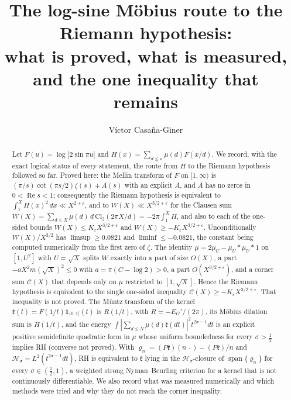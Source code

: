 \documentclass[11pt,reqno]{amsart}
\numberwithin{equation}{section}
\theoremstyle{plain}
\theoremstyle{definition}
\theoremstyle{remark}
\begin{document}
\title[The log-sine M\"obius route]{The log-sine M\"obius route to the Riemann hypothesis:\\ what is proved, what is measured, and the one inequality that remains}
\author{V\'ictor Casa\~na-Giner}
\date{}

\begin{abstract}
Let $F(u)=\log|2\sin\pi u|$ and $H(x)=\sum_{d\le x}\mu(d)F(x/d)$. We record, with the exact logical status of every statement, the route from $H$ to the Riemann hypothesis followed so far. Proved here: the Mellin transform of $F$ on $[1,\infty)$ is $(\pi/s)\cot(\pi s/2)\zeta(s)+A(s)$ with an explicit $A$, and $A$ has no zeros in $0<\operatorname{Re}s<1$; consequently the Riemann hypothesis is equivalent to $\int_1^XH(x)^2\,dx\ll X^{2+\varepsilon}$, and to $W(X)\ll X^{3/2+\varepsilon}$ for the Clausen sum $W(X)=\sum_{d\le X}\mu(d)\,d\,\mathrm{Cl}_2(2\pi X/d)=-2\pi\int_1^XH$, and also to each of the one-sided bounds $W(X)\le K_\varepsilon X^{3/2+\varepsilon}$ and $W(X)\ge-K_\varepsilon X^{3/2+\varepsilon}$. Unconditionally $W(X)/X^{3/2}$ has $\limsup\ge0.0821$ and $\liminf\le-0.0821$, the constant being computed numerically from the first zero of $\zeta$. The identity $\mu=2\mu_U-\mu_U*\mu_U*1$ on $[1,U^2]$ with $U=\sqrt X$ splits $W$ exactly into a part of size $O(X)$, a part $-aX^2m(\sqrt X)^2\le0$ with $a=\pi(C-\log2)>0$, a part $O(X^{3/2+\varepsilon})$, and a corner sum $\mathcal C(X)$ that depends only on $\mu$ restricted to $[1,\sqrt X]$. Hence the Riemann hypothesis is equivalent to the single one-sided inequality $\mathcal C(X)\ge-K_\varepsilon X^{3/2+\varepsilon}$. That inequality is not proved. The M\"untz transform of the kernel $\mathfrak k(t)=F(1/t)\mathbf 1_{(0,1]}(t)$ is $R(1/t)$, with $R=-E_G'/(2\pi)$, its M\"obius dilation sum is $H(1/t)$, and the energy $\int|\sum_{d\le N}\mu(d)\mathfrak k(dt)|^2t^{2\sigma-1}dt$ is an explicit positive semidefinite quadratic form in $\mu$ whose uniform boundedness for every $\sigma>\frac12$ implies RH (converse not proved). With $\varrho_n=(P\mathfrak k)(n\,\cdot)-(P\mathfrak k)/n$ and $\mathcal H_\sigma=L^2(t^{2\sigma-1}dt)$, RH is equivalent to $\mathfrak k$ lying in the $\mathcal H_\sigma$-closure of $\operatorname{span}\{\varrho_n\}$ for every $\sigma\in(\frac12,1)$, a weighted strong Nyman--Beurling criterion for a kernel that is not continuously differentiable. We also record what was measured numerically and which methods were tried and why they do not reach the corner inequality.
\end{abstract}
\end{document}
